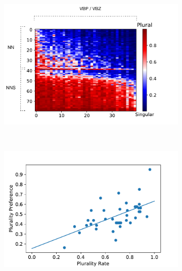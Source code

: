\begin{figure}
    \centering
    \begin{subfigure}[b]{0.4\textwidth}
    \caption{}
        \includegraphics[width=\textwidth]{matrix_plot_ratio.pdf}
        \label{fig:matrix_ratio}
    \end{subfigure}
    ~ %
    \begin{subfigure}[b]{0.4\textwidth}
    	\caption{}
        \includegraphics[width=\textwidth]{lin_reg.pdf}
        \label{fig:lin_reg}
    \end{subfigure}
        \begin{subfigure}[b]{0.4\textwidth}
    	\caption{}

\end{subfigure}
\end{figure}
